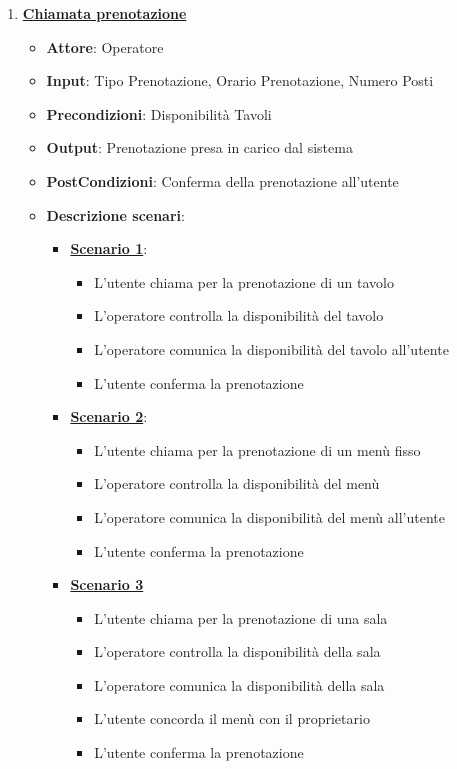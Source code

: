 \begin{enumerate}
    \item \uline {{\bf Chiamata prenotazione}}
    \begin{itemize}
        \item {\bf Attore}: Operatore
        \item {\bf Input}: Tipo Prenotazione, Orario Prenotazione, Numero Posti
        \item {\bf Precondizioni}: Disponibilit\`a Tavoli
        \item {\bf Output}: Prenotazione presa in carico dal sistema
        \item {\bf PostCondizioni}: Conferma della prenotazione all'utente
        \item {\bf Descrizione scenari}:
        \begin{itemize}
            \item \uline{{\bf Scenario 1}}:
            \begin{itemize}
                \item L'utente chiama per la prenotazione di un tavolo
                \item L'operatore controlla la disponibilit\`a del tavolo
                \item L'operatore comunica la disponibilit\`a del tavolo all'utente
                \item L'utente conferma la prenotazione
            \end{itemize}
            \item \uline{{\bf Scenario 2}}:
            \begin{itemize}
                \item L'utente chiama per la prenotazione di un men\`u fisso
                \item L'operatore controlla la disponibilit\`a del men\`u
                \item L'operatore comunica la disponibilit\`a del men\`u all'utente
                \item L'utente conferma la prenotazione
            \end{itemize}
            \item \uline{{\bf Scenario 3}}
            \begin{itemize}
                \item L'utente chiama per la prenotazione di una sala
                \item L'operatore controlla la disponibilit\`a della sala
                \item L'operatore comunica la disponibilit\`a della sala
                \item L'utente concorda il men\`u con il proprietario
                \item L'utente conferma la prenotazione
            \end{itemize}
        \end{itemize}
    \end{itemize}


\end{enumerate}
